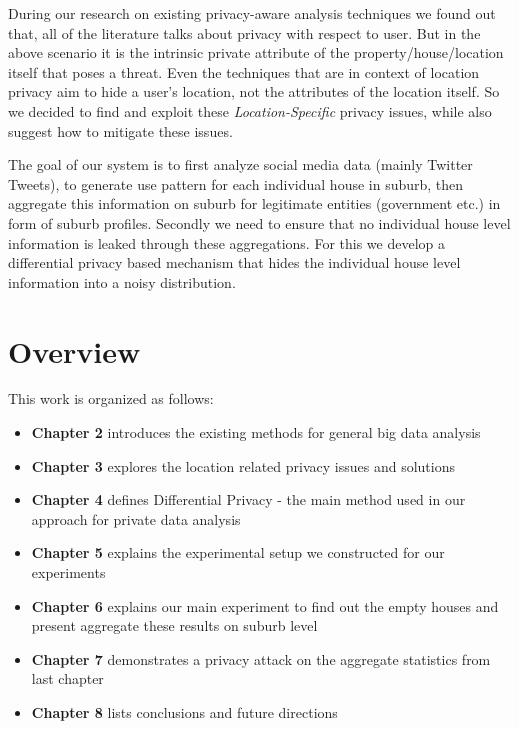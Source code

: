 \documentclass[12pt]{report}
\theoremstyle{named}
\begin{document}
During our research on existing privacy-aware analysis techniques we found out that, all of the literature talks about privacy with respect to user. But in the above scenario it is the intrinsic private attribute of the property/house/location itself that poses a threat. Even the techniques that are in context of location privacy aim to hide a user's location, not the attributes of the location itself. So we decided to find and exploit these \textit{Location-Specific} privacy issues, while also suggest how to mitigate these issues.

The goal of our system is to first analyze social media data (mainly Twitter Tweets), to generate use pattern for each individual house in suburb, then aggregate this information on suburb for legitimate entities (government etc.) in form of suburb profiles. Secondly we need to ensure that no individual house level information is leaked through these aggregations. For this we develop a differential privacy based mechanism that hides the individual house level information into a noisy distribution.


\section{Overview}
This work is organized as follows:

\begin{itemize}
  \item \textbf{Chapter 2} introduces the existing methods for general big data analysis 
  \item \textbf{Chapter 3} explores the location related privacy issues and solutions
  \item \textbf{Chapter 4} defines Differential Privacy - the main method used in our approach for private data analysis
  \item \textbf{Chapter 5} explains the experimental setup we constructed for our experiments
  \item \textbf{Chapter 6} explains our main experiment to find out the empty houses and present aggregate these results on suburb level
  \item \textbf{Chapter 7} demonstrates a privacy attack on the aggregate statistics from last chapter
  \item \textbf{Chapter 8} lists conclusions and future directions
\end{itemize}




\end{document}
